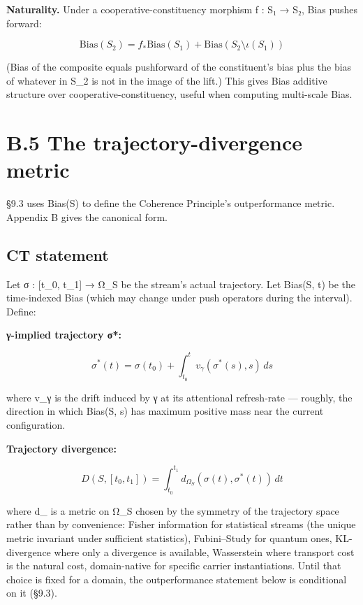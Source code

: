 \documentclass[11pt, openany]{book}
\newcommand{\sectionbreak}{\clearpage}
\begin{document}
\textbf{Naturality.} Under a cooperative-constituency morphism f : S₁ → S₂, Bias pushes forward:

$$\text{Bias}(S_2) = f_* \text{Bias}(S_1) + \text{Bias}(S_2 \setminus \iota(S_1))$$

(Bias of the composite equals pushforward of the constituent's bias plus the bias of whatever in S\_\allowbreak{}2 is not in the image of the lift.) This gives Bias additive structure over cooperative-constituency, useful when computing multi-scale Bias.

\sectionbreak

\section{B.5 The trajectory-divergence metric}

§9.3 uses Bias(S) to define the Coherence Principle's outperformance metric. Appendix B gives the canonical form.

\subsection{CT statement}

Let σ : [t\_\allowbreak{}0, t\_\allowbreak{}1] → Ω\_\allowbreak{}S be the stream's actual trajectory. Let Bias(S, t) be the time-indexed Bias (which may change under push operators during the interval). Define:

\textbf{γ-implied trajectory σ*:}

$$\sigma^*(t) = \sigma(t_0) + \int_{t_0}^{t} v_\gamma(\sigma^*(s), s) \, ds$$

where v\_\allowbreak{}γ is the drift induced by γ at its attentional refresh-rate --- roughly, the direction in which Bias(S, s) has maximum positive mass near the current configuration.

\textbf{Trajectory divergence:}

$$D(S, [t_0, t_1]) = \int_{t_0}^{t_1} d_{\Omega_S}(\sigma(t), \sigma^*(t)) \, dt$$

where d\_ is a metric on Ω\_\allowbreak{}S chosen by the symmetry of the trajectory space rather than by convenience: Fisher information for statistical streams (the unique metric invariant under sufficient statistics), Fubini–Study for quantum ones, KL-divergence where only a divergence is available, Wasserstein where transport cost is the natural cost, domain-native for specific carrier instantiations. Until that choice is fixed for a domain, the outperformance statement below is conditional on it (§9.3).
\end{document}
